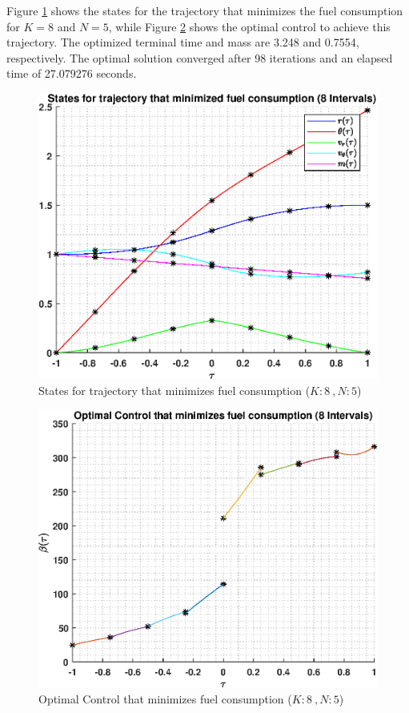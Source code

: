 \documentclass[]{article}
\begin{document}
\vspace{2mm}\newline 
Figure \ref{fig:directStatesK8Poly5} shows the states for the trajectory that minimizes the fuel consumption for \(K = 8\) and  \(N = 5\), while Figure \ref{fig:directControlK8Poly5} shows the optimal control to achieve this trajectory. The optimized terminal time and mass are 3.248 and 0.7554, respectively. The optimal solution converged after 98 iterations and an elapsed time of 27.079276 seconds.
\begin{figure}
	\centering
	\includegraphics[scale=0.75]{directStatesK8Poly5.eps}
	\caption{States for trajectory that minimizes fuel consumption (\(K:8\ , N:5\))}
	\label{fig:directStatesK8Poly5}
\end{figure}
\begin{figure}
	\centering
	\includegraphics[scale=0.75]{directControlK8Poly5.eps}
	\caption{Optimal Control that minimizes fuel consumption (\(K:8\ , N:5\))}
	\label{fig:directControlK8Poly5}
\end{figure}
\end{document}
